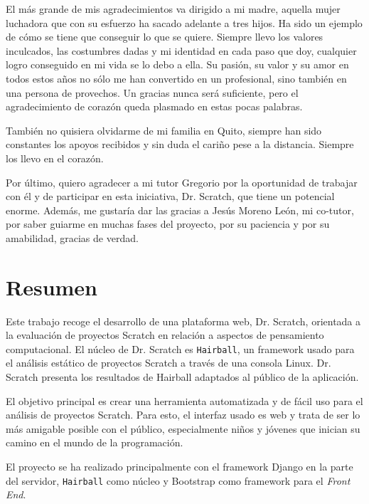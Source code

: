 \documentclass[a4paper, 12pt]{book}
\begin{document}
El más grande de mis agradecimientos va dirigido a mi madre, aquella mujer luchadora que
con su esfuerzo ha sacado adelante a tres hijos. Ha sido un ejemplo de cómo se tiene que
conseguir lo que se quiere. Siempre llevo los valores inculcados, las costumbres dadas y
mi identidad en cada paso que doy, cualquier logro conseguido en mi vida se lo debo a ella.
Su pasión, su valor y su amor en todos estos años no sólo me han convertido en un profesional,
sino también en una persona de provechos. Un gracias nunca será suficiente, pero el
agradecimiento de corazón queda plasmado en estas pocas palabras.

También no quisiera olvidarme de mi familia en Quito, siempre han sido constantes los apoyos
recibidos y sin duda el cariño pese a la distancia. Siempre los llevo en el corazón.

Por último, quiero agradecer a mi tutor Gregorio por la oportunidad de trabajar con él y
de participar en esta iniciativa, Dr. Scratch, que tiene un potencial enorme. Además, 
me gustaría dar las gracias a Jesús Moreno León, mi co-tutor, por saber guiarme en muchas
fases del proyecto, por su paciencia y por su amabilidad, gracias de verdad.


\chapter*{Resumen}


Este trabajo recoge el desarrollo de una plataforma web, Dr. Scratch, orientada a la 
evaluación de proyectos Scratch en relación a aspectos de pensamiento computacional. 
El núcleo de Dr. Scratch es \texttt{Hairball}, un framework usado para el análisis estático de 
proyectos Scratch a través de una consola Linux. Dr. Scratch presenta los resultados
de Hairball adaptados al público de la aplicación.

El objetivo principal es crear una herramienta automatizada y de fácil uso para el 
análisis de proyectos Scratch. Para esto, el interfaz usado es web y trata de ser 
lo más amigable posible con el público, especialmente niños y jóvenes que inician
su camino en el mundo de la programación.

El proyecto se ha realizado principalmente con el framework Django en la parte del
servidor, \texttt{Hairball} como núcleo y Bootstrap como framework para el \emph{Front End}.
\end{document}
